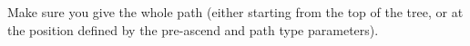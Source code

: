 
Make sure you give the whole path (either starting from the top of the tree, or at the position defined by the pre-ascend and path type parameters).



